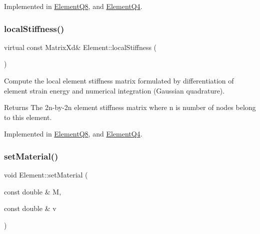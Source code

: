 Implemented in \mbox{\hyperlink{class_element_q8_ae23bf98a466daa224224da495d5724ff}{Element\+Q8}}, and \mbox{\hyperlink{class_element_q4_a1347c3ce4ef1c34a16aa72fdf593932d}{Element\+Q4}}.

\mbox{\label{class_element_a603fbe060b5d6979506f0d2130e6c171}} 
\subsubsection{\texorpdfstring{local\+Stiffness()}{localStiffness()}}
{\footnotesize\ttfamily virtual const Matrix\+Xd\& Element\+::local\+Stiffness (\begin{DoxyParamCaption}{ }\end{DoxyParamCaption})\hspace{0.3cm}{\ttfamily [pure virtual]}}



Compute the local element stiffness matrix formulated by differentiation of element strain energy and numerical integration (Gaussian quadrature). 

\begin{DoxyReturn}{Returns}
The 2n-\/by-\/2n element stiffness matrix where n is number of nodes belong to this element. 
\end{DoxyReturn}


Implemented in \mbox{\hyperlink{class_element_q8_afc898e404f9abb5a5a4d74eee54476b7}{Element\+Q8}}, and \mbox{\hyperlink{class_element_q4_a9a127fdfd6f80efe3c35f20d7b1296cf}{Element\+Q4}}.

\mbox{\label{class_element_ad74b47354fe0608c9baba38c79e5b549}} 
\subsubsection{\texorpdfstring{set\+Material()}{setMaterial()}}
{\footnotesize\ttfamily void Element\+::set\+Material (\begin{DoxyParamCaption}\item[{const double \&}]{M,  }\item[{const double \&}]{v }\end{DoxyParamCaption})}



